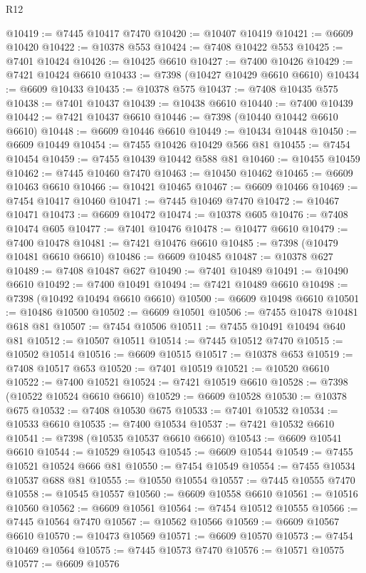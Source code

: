 \begin{lexlean}{R12}
\begin{coremodule}
{{{{{{{{{{{{{{{{{{{{{{{{{{{{{{{{{{{{{{{{{{{{{{{{{{{{{{{{{{{{{{{{{{{{{{{{{{{{{{{{{{@10419 := @7445 @10417 @7470
@10420 := @10407 @10419
@10421 := @6609 @10420
@10422 := @10378 @553
@10424 := @7408 @10422 @553
@10425 := @7401 @10424
@10426 := @10425 @6610
@10427 := @7400 @10426
@10429 := @7421 @10424 @6610
@10433 := @7398 (@10427 @10429 @6610 @6610)
@10434 := @6609 @10433
@10435 := @10378 @575
@10437 := @7408 @10435 @575
@10438 := @7401 @10437
@10439 := @10438 @6610
@10440 := @7400 @10439
@10442 := @7421 @10437 @6610
@10446 := @7398 (@10440 @10442 @6610 @6610)
@10448 := @6609 @10446 @6610
@10449 := @10434 @10448
@10450 := @6609 @10449
@10454 := @7455 @10426 @10429 @566 @81
@10455 := @7454 @10454
@10459 := @7455 @10439 @10442 @588 @81
@10460 := @10455 @10459
@10462 := @7445 @10460 @7470
@10463 := @10450 @10462
@10465 := @6609 @10463 @6610
@10466 := @10421 @10465
@10467 := @6609 @10466
@10469 := @7454 @10417 @10460
@10471 := @7445 @10469 @7470
@10472 := @10467 @10471
@10473 := @6609 @10472
@10474 := @10378 @605
@10476 := @7408 @10474 @605
@10477 := @7401 @10476
@10478 := @10477 @6610
@10479 := @7400 @10478
@10481 := @7421 @10476 @6610
@10485 := @7398 (@10479 @10481 @6610 @6610)
@10486 := @6609 @10485
@10487 := @10378 @627
@10489 := @7408 @10487 @627
@10490 := @7401 @10489
@10491 := @10490 @6610
@10492 := @7400 @10491
@10494 := @7421 @10489 @6610
@10498 := @7398 (@10492 @10494 @6610 @6610)
@10500 := @6609 @10498 @6610
@10501 := @10486 @10500
@10502 := @6609 @10501
@10506 := @7455 @10478 @10481 @618 @81
@10507 := @7454 @10506
@10511 := @7455 @10491 @10494 @640 @81
@10512 := @10507 @10511
@10514 := @7445 @10512 @7470
@10515 := @10502 @10514
@10516 := @6609 @10515
@10517 := @10378 @653
@10519 := @7408 @10517 @653
@10520 := @7401 @10519
@10521 := @10520 @6610
@10522 := @7400 @10521
@10524 := @7421 @10519 @6610
@10528 := @7398 (@10522 @10524 @6610 @6610)
@10529 := @6609 @10528
@10530 := @10378 @675
@10532 := @7408 @10530 @675
@10533 := @7401 @10532
@10534 := @10533 @6610
@10535 := @7400 @10534
@10537 := @7421 @10532 @6610
@10541 := @7398 (@10535 @10537 @6610 @6610)
@10543 := @6609 @10541 @6610
@10544 := @10529 @10543
@10545 := @6609 @10544
@10549 := @7455 @10521 @10524 @666 @81
@10550 := @7454 @10549
@10554 := @7455 @10534 @10537 @688 @81
@10555 := @10550 @10554
@10557 := @7445 @10555 @7470
@10558 := @10545 @10557
@10560 := @6609 @10558 @6610
@10561 := @10516 @10560
@10562 := @6609 @10561
@10564 := @7454 @10512 @10555
@10566 := @7445 @10564 @7470
@10567 := @10562 @10566
@10569 := @6609 @10567 @6610
@10570 := @10473 @10569
@10571 := @6609 @10570
@10573 := @7454 @10469 @10564
@10575 := @7445 @10573 @7470
@10576 := @10571 @10575
@10577 := @6609 @10576
}}}}}}}}}}}}}}}}}}}}}}}}}}}}}}}}}}}}}}}}}}}}}}}}}}}}}}}}}}}}}}}}}}}}}}}}}}}}}}}}}}
\end{coremodule}
\end{lexlean}
